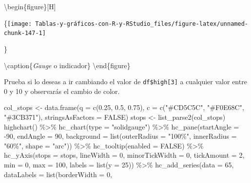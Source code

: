 \documentclass[
]{book}
\newenvironment{Shaded}{\begin{snugshade}}{\end{snugshade}}
\newcommand{\AttributeTok}[1]{\textcolor[rgb]{0.77,0.63,0.00}{#1}}
\newcommand{\ConstantTok}[1]{\textcolor[rgb]{0.00,0.00,0.00}{#1}}
\newcommand{\DecValTok}[1]{\textcolor[rgb]{0.00,0.00,0.81}{#1}}
\newcommand{\FloatTok}[1]{\textcolor[rgb]{0.00,0.00,0.81}{#1}}
\newcommand{\FunctionTok}[1]{\textcolor[rgb]{0.00,0.00,0.00}{#1}}
\newcommand{\NormalTok}[1]{#1}
\newcommand{\OtherTok}[1]{\textcolor[rgb]{0.56,0.35,0.01}{#1}}
\newcommand{\SpecialCharTok}[1]{\textcolor[rgb]{0.00,0.00,0.00}{#1}}
\newcommand{\StringTok}[1]{\textcolor[rgb]{0.31,0.60,0.02}{#1}}
\begin{document}
\textbackslash begin\{figure\}{[}H{]}

\{\centering \texttt{[image: Tablas-y-gráficos-con-R-y-RStudio\_files/figure-latex/unnamed-chunk-147-1]}

\}

\textbackslash caption\{\emph{Gauge} o indicador\}\label{fig:unnamed-chunk-147}
\textbackslash end\{figure\}

Prueba si lo deseas a ir cambiando el valor de \texttt{df\$high{[}3{]}} a cualquier valor entre 0 y 10 y observarás el cambio de color.

\begin{Shaded}
\begin{Highlighting}[]
\NormalTok{col\_stops }\OtherTok{\textless{}{-}} \FunctionTok{data.frame}\NormalTok{(}\AttributeTok{q =} \FunctionTok{c}\NormalTok{(}\FloatTok{0.25}\NormalTok{, }\FloatTok{0.5}\NormalTok{, }\FloatTok{0.75}\NormalTok{), }\AttributeTok{c =} \FunctionTok{c}\NormalTok{(}\StringTok{"\#CD5C5C"}\NormalTok{, }
  \StringTok{"\#F0E68C"}\NormalTok{, }\StringTok{"\#3CB371"}\NormalTok{), }\AttributeTok{stringsAsFactors =} \ConstantTok{FALSE}\NormalTok{)}
\NormalTok{stops }\OtherTok{\textless{}{-}} \FunctionTok{list\_parse2}\NormalTok{(col\_stops)}
\FunctionTok{highchart}\NormalTok{() }\SpecialCharTok{\%\textgreater{}\%} \FunctionTok{hc\_chart}\NormalTok{(}\AttributeTok{type =} \StringTok{"solidgauge"}\NormalTok{) }\SpecialCharTok{\%\textgreater{}\%} \FunctionTok{hc\_pane}\NormalTok{(}\AttributeTok{startAngle =} \SpecialCharTok{{-}}\DecValTok{90}\NormalTok{, }
  \AttributeTok{endAngle =} \DecValTok{90}\NormalTok{, }\AttributeTok{background =} \FunctionTok{list}\NormalTok{(}\AttributeTok{outerRadius =} \StringTok{"100\%"}\NormalTok{, }
    \AttributeTok{innerRadius =} \StringTok{"60\%"}\NormalTok{, }\AttributeTok{shape =} \StringTok{"arc"}\NormalTok{)) }\SpecialCharTok{\%\textgreater{}\%} \FunctionTok{hc\_tooltip}\NormalTok{(}\AttributeTok{enabled =} \ConstantTok{FALSE}\NormalTok{) }\SpecialCharTok{\%\textgreater{}\%} 
  \FunctionTok{hc\_yAxis}\NormalTok{(}\AttributeTok{stops =}\NormalTok{ stops, }\AttributeTok{lineWidth =} \DecValTok{0}\NormalTok{, }\AttributeTok{minorTickWidth =} \DecValTok{0}\NormalTok{, }
    \AttributeTok{tickAmount =} \DecValTok{2}\NormalTok{, }\AttributeTok{min =} \DecValTok{0}\NormalTok{, }\AttributeTok{max =} \DecValTok{100}\NormalTok{, }\AttributeTok{labels =} \FunctionTok{list}\NormalTok{(}\AttributeTok{y =} \DecValTok{25}\NormalTok{)) }\SpecialCharTok{\%\textgreater{}\%} 
  \FunctionTok{hc\_add\_series}\NormalTok{(}\AttributeTok{data =} \DecValTok{65}\NormalTok{, }\AttributeTok{dataLabels =} \FunctionTok{list}\NormalTok{(}\AttributeTok{borderWidth =} \DecValTok{0}\NormalTok{, }

\end{Highlighting}
\end{Shaded}
\end{document}
